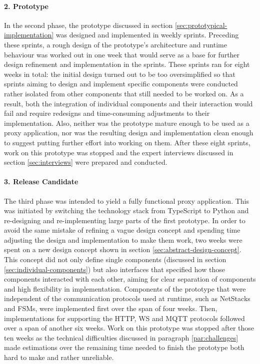 \paragraph{2. Prototype} In the second phase, the prototype discussed in section \ref{sec:prototypical-implementation} was designed and implemented in weekly sprints. Preceding these sprints, a rough design of the prototype's architecture and runtime behaviour was worked out in one week that would serve as a base for further design refinement and implementation in the sprints. These sprints ran for eight weeks in total: the initial design turned out to be too oversimplified so that sprints aiming to design and implement specific components were conducted rather isolated from other components that still needed to be worked on. As a result, both the integration of individual components and their interaction would fail and require redesigns and time-consuming adjustments to their implementation. Also, neither was the prototype mature enough to be used as a proxy application, nor was the resulting design and implementation clean enough to suggest putting further effort into working on them. After these eight sprints, work on this prototype was stopped and the expert interviews discussed in section \ref{sec:interviews} were prepared and conducted.
\paragraph{3. Release Candidate} The third phase was intended to yield a fully functional proxy application. This was initiated by switching the technology stack from TypeScript to Python and re-designing and re-implementing large parts of the first prototype. In order to avoid the same mistake of refining a vague design concept and spending time adjusting the design and implementation to make them work, two weeks were spent on a new design concept shown in section \ref{sec:abstract-design-concept}. This concept did not only define single components (discussed in section \ref{sec:individual-components}) but also interfaces that specified how those components interacted with each other, aiming for clear separation of components and high flexibility in implementation. Components of the prototype that were independent of the communication protocols used at runtime, such as NetStacks and \acp{FSM}, were implemented first over the span of four weeks. Then, implementations for supporting the \ac{HTTP}, \ac{WS} and \ac{MQTT} protocols followed over a span of another six weeks. Work on this prototype was stopped after those ten weeks as the technical difficulties discussed in paragraph \ref{par:challenges} made estimations over the remaining time needed to finish the prototype both hard to make and rather unreliable.

